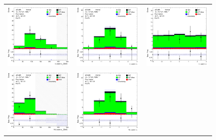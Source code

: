 \begin{figure}[htbp]
  \begin{tabular}{ccc}


    \includegraphics[width=.3\textwidth]{figures/PreFitPlots/lep4_ttZ_4T_L_lepton_pt.png} &
    \includegraphics[width=.3\textwidth]{figures/PreFitPlots/lep4_ttZ_4T_L_lepton_eta.png} &
    \includegraphics[width=.3\textwidth]{figures/PreFitPlots/lep4_ttZ_4T_L_lepton_phi.png} \\
    \includegraphics[width=.3\textwidth]{figures/PreFitPlots/lep4_ttZ_4T_NL_lepton_pt.png} &
    \includegraphics[width=.3\textwidth]{figures/PreFitPlots/lep4_ttZ_4T_NL_lepton_eta.png} &

\end{tabular}
\end{figure}
